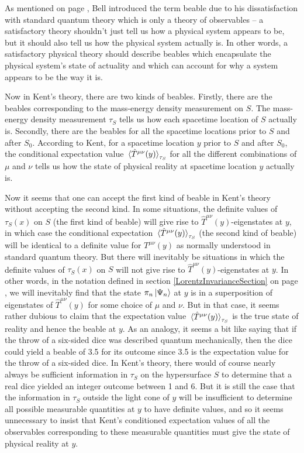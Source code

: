 As mentioned on page \pageref{beabledef}, Bell introduced the term beable due to his dissatisfaction with standard quantum theory which is only a theory of observables -- a satisfactory theory shouldn't just tell us how a physical system appears to be, but it should also tell us how the physical system actually is. In other words, a satisfactory physical theory should describe beables which encapsulate the physical system's state of actuality and which can account for why a system appears to be the way it is. 

Now in Kent's theory, there are two kinds of beables. Firstly, there are the beables corresponding to the mass-energy density measurement on $S$. The mass-energy density measurement $\tau_S$ tells us how each spacetime location of $S$ actually is. Secondly, there are the beables for all the spacetime locations prior to $S$ and after $S_0$. According to Kent, for a spacetime location $y$ prior to $S$ and after $S_0$, the conditional expectation value  $\ev*{\hat{T}^{\mu\nu}(y)}_{\tau_S}$ for all the different combinations of $\mu$ and $\nu$ tells us how the state of physical reality at spacetime location $y$ actually is. 

Now it seems that one can accept the first kind of beable in Kent's theory without accepting the second kind. In some situations, the definite values of $\tau_S(x)$ on $S$ (the first kind of beable) will give rise to $\hat{T}^{\mu\nu}(y)$-eigenstates at $y$, in which case the conditional expectation $\ev*{\hat{T}^{\mu\nu}(y)}_{\tau_S}$ (the second kind of beable) will be identical to a definite value for $T^{\mu\nu}(y)$ as normally understood in standard quantum theory. But there will inevitably be situations in which the definite values of $\tau_S(x)$ on $S$ will not give rise to  $\hat{T}^{\mu\nu}(y)$-eigenstates at $y$. In other words, in the notation defined in section \ref{LorentzInvarianceSection} on page \pageref{tauprojection}, we will inevitably find that the state $\pi_n\ket{\Psi_n}$ at $y$ is in a superposition of eigenstates of $\hat{T}^{\mu\nu}(y)$ for some choice of $\mu$ and $\nu$. But in that case, it seems rather dubious to claim that the expectation value $\ev*{\hat{T}^{\mu\nu}(y)}_{\tau_S}$ is the true state of reality and hence the beable at $y$. As an analogy, it seems a bit like saying that if the throw of a six-sided dice was described quantum mechanically, then the dice could yield a beable of 3.5 for its outcome since 3.5 is the expectation value for the throw of a six-sided dice. In Kent's theory, there would of course nearly always be sufficient information in $\tau_S$ on the hypersurface $S$  to determine that a real dice yielded an integer outcome between 1 and 6.  But it is still the case that the information in $\tau_S$ outside the light cone of $y$ will be insufficient to determine all possible measurable quantities at $y$ to have definite values, and so it seems unnecessary to insist that Kent's conditioned expectation values of all the observables corresponding to these measurable quantities must give the state of physical reality at $y$. 

